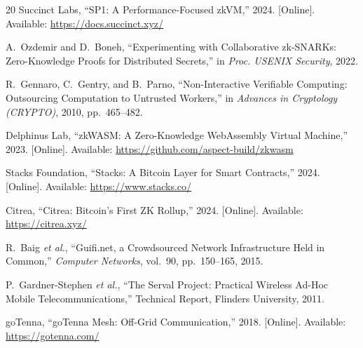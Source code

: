 \documentclass[11pt,a4paper]{article}
\begin{document}
\begin{thebibliography}{20}
Succinct Labs, ``SP1: A Performance-Focused zkVM,'' 2024. [Online]. Available: \url{https://docs.succinct.xyz/}

A.~Ozdemir and D.~Boneh, ``Experimenting with Collaborative zk-SNARKs: Zero-Knowledge Proofs for Distributed Secrets,'' in \textit{Proc. USENIX Security}, 2022.

R.~Gennaro, C.~Gentry, and B.~Parno, ``Non-Interactive Verifiable Computing: Outsourcing Computation to Untrusted Workers,'' in \textit{Advances in Cryptology (CRYPTO)}, 2010, pp.~465--482.

Delphinus Lab, ``zkWASM: A Zero-Knowledge WebAssembly Virtual Machine,'' 2023. [Online]. Available: \url{https://github.com/aspect-build/zkwasm}

Stacks Foundation, ``Stacks: A Bitcoin Layer for Smart Contracts,'' 2024. [Online]. Available: \url{https://www.stacks.co/}

Citrea, ``Citrea: Bitcoin's First ZK Rollup,'' 2024. [Online]. Available: \url{https://citrea.xyz/}

R.~Baig \textit{et al.}, ``Guifi.net, a Crowdsourced Network Infrastructure Held in Common,'' \textit{Computer Networks}, vol.~90, pp.~150--165, 2015.

P.~Gardner-Stephen \textit{et al.}, ``The Serval Project: Practical Wireless Ad-Hoc Mobile Telecommunications,'' Technical Report, Flinders University, 2011.

goTenna, ``goTenna Mesh: Off-Grid Communication,'' 2018. [Online]. Available: \url{https://gotenna.com/}

\end{thebibliography}
\end{document}
